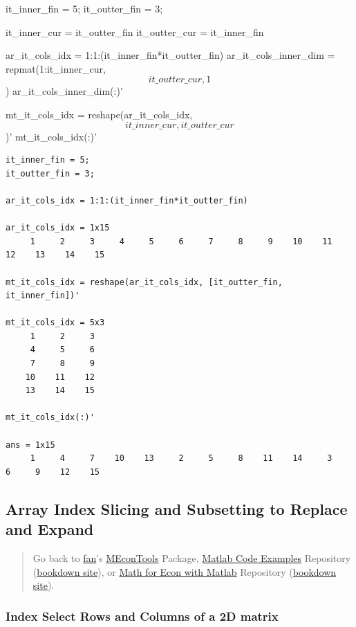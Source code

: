 \documentclass[
]{book}
\begin{document}
it\_inner\_fin = 5; it\_outter\_fin = 3;

it\_inner\_cur = it\_outter\_fin it\_outter\_cur = it\_inner\_fin

ar\_it\_cols\_idx = 1:1:(it\_inner\_fin*it\_outter\_fin)
ar\_it\_cols\_inner\_dim = repmat(1:it\_inner\_cur, \[it\_outter\_cur,
1\]) ar\_it\_cols\_inner\_dim(:)'

mt\_it\_cols\_idx = reshape(ar\_it\_cols\_idx, \[it\_inner\_cur,
it\_outter\_cur\])' mt\_it\_cols\_idx(:)'

\begin{verbatim}
it_inner_fin = 5;
it_outter_fin = 3;

ar_it_cols_idx = 1:1:(it_inner_fin*it_outter_fin)

ar_it_cols_idx = 1x15    
     1     2     3     4     5     6     7     8     9    10    11    12    13    14    15

mt_it_cols_idx = reshape(ar_it_cols_idx, [it_outter_fin, it_inner_fin])'

mt_it_cols_idx = 5x3    
     1     2     3
     4     5     6
     7     8     9
    10    11    12
    13    14    15

mt_it_cols_idx(:)'

ans = 1x15    
     1     4     7    10    13     2     5     8    11    14     3     6     9    12    15
\end{verbatim}

\hypertarget{array-index-slicing-and-subsetting-to-replace-and-expand}{%
\subsection{Array Index Slicing and Subsetting to Replace and Expand}\label{array-index-slicing-and-subsetting-to-replace-and-expand}}

\begin{quote}
Go back to \href{http://fanwangecon.github.io/}{fan}'s \href{https://fanwangecon.github.io/MEconTools/}{MEconTools} Package, \href{https://fanwangecon.github.io/M4Econ/}{Matlab Code Examples} Repository (\href{https://fanwangecon.github.io/M4Econ/bookdown}{bookdown site}), or \href{https://fanwangecon.github.io/Math4Econ/}{Math for Econ with Matlab} Repository (\href{https://fanwangecon.github.io/Math4Econ/bookdown}{bookdown site}).
\end{quote}

\hypertarget{index-select-rows-and-columns-of-a-2d-matrix}{%
\subsubsection{Index Select Rows and Columns of a 2D matrix}\label{index-select-rows-and-columns-of-a-2d-matrix}}
\end{document}
